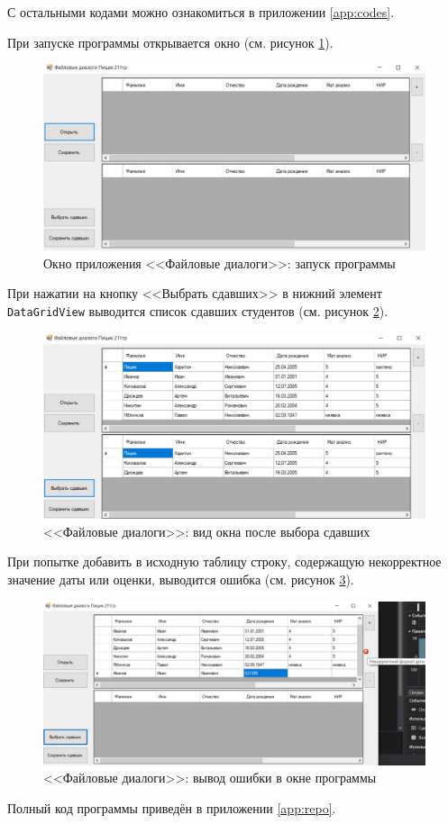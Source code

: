 С остальными кодами можно ознакомиться в приложении \ref{app:codes}.

При запуске программы открывается окно (см. рисунок \ref{fig:files_res}).
\begin{figure}[H]
\centering
\includegraphics[scale=.45]{../img/files/files_res.jpg}
\caption{Окно приложения <<Файловые диалоги>>: запуск программы}
\label{fig:files_res}
\end{figure}

При нажатии на кнопку <<Выбрать сдавших>> в нижний элемент \verb|DataGridView| выводится список 
сдавших студентов (см. рисунок \ref{fig:files_choose}).
\begin{figure}[H]
\centering
\includegraphics[scale=.45]{../img/files/files_choose.jpg}
\caption{<<Файловые диалоги>>: вид окна после выбора сдавших}
\label{fig:files_choose}
\end{figure}

При попытке добавить в исходную таблицу строку, содержащую некорректное значение даты или оценки, выводится ошибка 
(см. рисунок \ref{fig:files_error}).
\begin{figure}[H]
\centering
\includegraphics[scale=.45]{../img/files/files_error.jpg}
\caption{<<Файловые диалоги>>: вывод ошибки в окне программы}
\label{fig:files_error}
\end{figure}

Полный код программы приведён в приложении \ref{app:repo}.